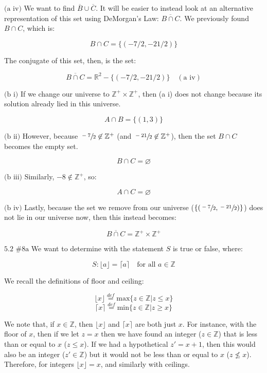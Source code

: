 \documentclass{article}
\newcommand{\problem}[2]{$\boxed{\text{#1 \##2}}$}
\newcommand{\subproblem}[1]{$\boxed{\text{(#1)}}$}
\newcommand{\subsolution}[2]{\boxed{#2\quad(\text{#1})}}
\newcommand{\solution}[1]{\boxed{#1}}
\newcommand{\conj}[1]{\overline{#1}}
\begin{document}
%
\subproblem{a iv} We want to find $\conj{B}\cup\conj{C}$. It will be
easier to instead look at an alternative representation of this set
using DeMorgan's Law: $\conj{B\cap{}C}$. We previously found
$B\cap{}C$, which is:

\[
B\cap C=\{(-7/2,-21/2)\}
\]

The conjugate of this set, then, is the set:

\[
\subsolution{a iv}{\conj{B\cap C}=\mathbb{R}^2 - \{(-7/2, -21/2)\}}
\]

%
\subproblem{b i} If we change our universe to
$\mathbb{Z}^+\times\mathbb{Z}^+$, then (a i) does not change because
its solution already lied in this universe.

\[
\solution{A\cap B=\{(1,3)\}}
\]

%
\subproblem{b ii} However, because $\sfrac{-7}{2}\not\in\mathbb{Z}^+$
(and $\sfrac{-21}{2}\not\in\mathbb{Z}^+$), then the set $B\cap{}C$
becomes the empty set.

\[
\solution{B\cap C=\varnothing}
\]

%
\subproblem{b iii} Similarly, $-8\not\in\mathbb{Z}^+$, so:

\[
\solution{A\cap C=\varnothing}
\]

%
\subproblem{b iv} Lastly, because the set we remove from our universe
($\{(\sfrac{-7}{2},\sfrac{-21}{2})\}$) does not lie in our universe
now, then this instead becomes:

\[
\solution{\conj{B\cap C}=\mathbb{Z}^+\times\mathbb{Z}^+}
\]

%
\problem{5.2}{8a} We want to determine with the statement $S$ is true
or false, where:

\[
S:\lfloor a\rfloor =\lceil a\rceil\quad\text{for all $a\in\mathbb{Z}$}
\]

We recall the definitions of floor and ceiling:

\[
\lfloor x\rfloor \overset{def}{=}\text{max}\{z\in\mathbb{Z}|z\le x\}
\] \[
\lceil x\rceil \overset{def}{=}\text{min}\{z\in\mathbb{Z}|z\ge x\}
\]

We note that, if $x\in\mathbb{Z}$, then $\lfloor{}x\rfloor$ and
$\lceil{}x\rceil$ are both just $x$. For instance, with the floor of
$x$, then if we let $z=x$ then we have found an integer
($z\in\mathbb{Z}$) that is less than or equal to $x$ ($z\le{}x$). If
we had a hypothetical $z'=x+1$, then this would also be an integer
($z'\in\mathbb{Z}$) but it would not be less than or equal to $x$
($z\not\le{}x$). Therefore, for integers $\lfloor{}x\rfloor=x$, and
similarly with ceilings.
\end{document}
